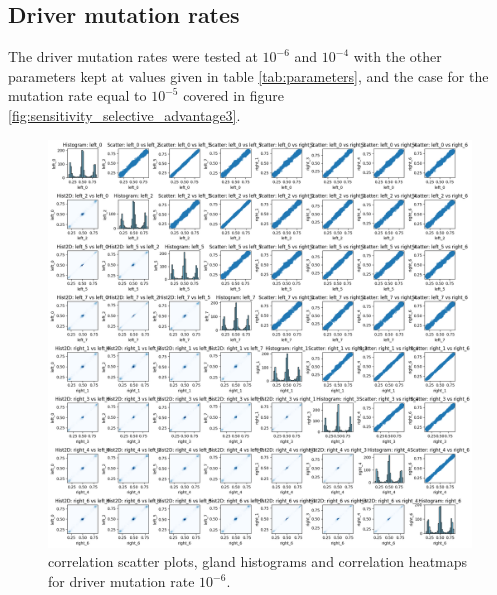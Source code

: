 \subsection{Driver mutation rates}
The driver mutation rates were tested at $10^{-6}$ and $10^{-4}$ with the other parameters kept at values given in table \ref{tab:parameters}, and the case for the mutation rate equal to $10^{-5}$ covered in figure \ref{fig:sensitivity_selective_advantage3}.
\begin{figure}[h]
    \centering
    \includegraphics[width=\textwidth]{Chapter_5/figures/sensitivity_driver1.png}
    \caption{correlation scatter plots, gland histograms and correlation heatmaps for driver mutation rate $10^{-6}$.}
    \label{fig:sensitivity_driver1}
\end{figure}

